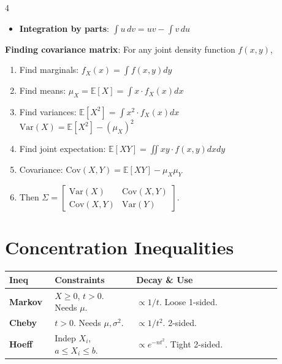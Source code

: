\documentclass[9pt]{extarticle}
\begin{document}
\begin{multicols*}{4}
\begin{itemize}
    \item \textbf{Integration by parts}: $\int u \,dv = uv - \int v \,du$
\end{itemize}
\textbf{Finding covariance matrix}: For any joint density function $f(x,y)$,
\begin{enumerate}
    \item Find marginals: $f_X(x) = \int f(x,y) dy$
    \item Find means: $\mu_X = \mathbb{E}[X] = \int x \cdot f_X(x) dx$
    \item Find variances: $\mathbb{E}[X^2] = \int x^2 \cdot f_X(x) dx$\\
    $\text{Var}(X) = \mathbb{E}[X^2] - (\mu_X)^2$
    \item Find joint expectation: $\mathbb{E}[XY] = \iint xy \cdot f(x,y) dx dy$
    \item Covariance: $\text{Cov}(X,Y) = \mathbb{E}[XY] - \mu_X\mu_Y$
    \item Then $\Sigma = \begin{bmatrix} \text{Var}(X) & \text{Cov}(X,Y) \\ \text{Cov}(X,Y) & \text{Var}(Y) \end{bmatrix}$.
\end{enumerate}
 
 
\section*{Concentration Inequalities} 
\vspace{0.3em}
\noindent\begin{tabular}{@{} p{0.13\linewidth} | p{0.27\linewidth} | p{0.48\linewidth} @{}}
\textbf{Ineq} & \textbf{Constraints} & \textbf{Decay \& Use} \\ \hline
\textbf{Markov} & $X \ge 0$, $t > 0$. Needs $\mu$. & $\propto 1/t$. Loose 1-sided. \\ \hline
\textbf{Cheby} & $t > 0$. Needs $\mu, \sigma^2$. & $\propto 1/t^2$. 2-sided. \\ \hline
\textbf{Hoeff} & Indep $X_i$, $a \le X_i \le b$. & $\propto e^{-nt^2}$. Tight 2-sided. \\
\end{tabular}
\vspace{0.3em}
 

\end{multicols*}
\end{document}

